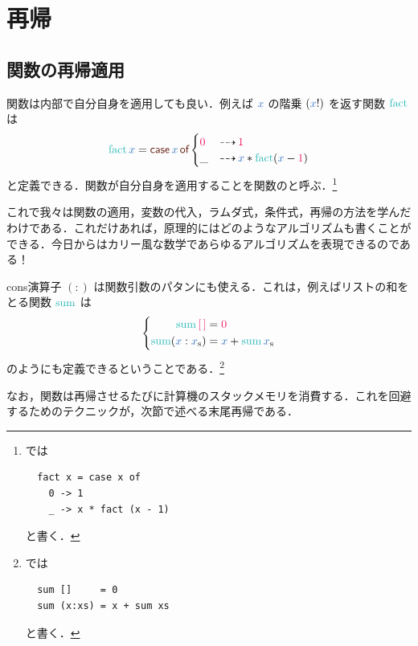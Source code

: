 \documentclass[a5paper,twoside,fleqn,draft]{jsbook}
\begin{document}
\chapter{再帰}
\label{ch:recursion}

\begin{leader}
\end{leader}

\section{関数の再帰適用}

関数は内部で自分自身を適用しても良い．例えば $\hVar{x}$ の階乗 $(\hVar{x}!)$ を返す関数 $\mFact$ は
\begin{equation}
  \mFact\hVar{x}
  =\hCaseSyntax{\hVar{x}}
  \begin{cases}
    \hConstant{0}
    &\hIfSo\hConstant{1}\\
    \_
    &\hIfSo\hVar{x}*\mFact(\hVar{x}-\hConstant{1})
  \end{cases}
\end{equation}
と定義できる．関数が自分自身を適用することを関数のと呼ぶ．\footnote{\haskell では
\begin{verbatim}
  fact x = case x of
    0 -> 1
    _ -> x * fact (x - 1)
\end{verbatim}
と書く．}

これで我々は関数の適用，変数の代入，ラムダ式，条件式，再帰の方法を学んだわけである．これだけあれば，原理的にはどのようなアルゴリズムも書くことができる．今日からはカリー風な数学であらゆるアルゴリズムを表現できるのである！

\separator

cons演算子 $(:)$ は関数引数のパタンにも使える．これは，例えばリストの和をとる関数 $\mSum$ は
\begin{equation}
  \left\{
  \begin{aligned}
    \mSum\mEmptyList
    &=\hConstant{0}\\
    \mSum(\hVar{x}:\mList{x})
    &=\hVar{x}+\mSum\mList{x}
  \end{aligned}
  \right.
\end{equation}
のようにも定義できるということである．\footnote{\haskell では
\begin{verbatim}
  sum []     = 0
  sum (x:xs) = x + sum xs
\end{verbatim}
と書く．}

なお，関数は再帰させるたびに計算機のスタックメモリを消費する．これを回避するためのテクニックが，次節で述べる末尾再帰である．
\end{document}

